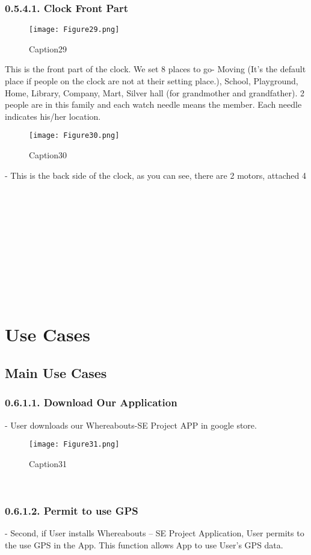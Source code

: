 \documentclass[10pt,a4paper,twocolumn]{report}
\begin{document}
		\subsubsection{0.5.4.1. Clock Front Part}
		\begin{figure}[h]
				\texttt{[image: Figure29.png]}
				\caption{Caption29}
				\label{fig29}
		\end{figure}
		This is the front part of the clock. We set 8 places to go-
Moving (It’s the default place if people on the clock are not at
their setting place.), School, Playground, Home, Library,
Company, Mart, Silver hall (for grandmother and grandfather).
2 people are in this family and each watch needle means the
member. Each needle indicates his/her location.
		\begin{figure}[h]
				\texttt{[image: Figure30.png]}
				\caption{Caption30}
				\label{fig30}
		\end{figure}
		- This is the back side of the clock, as you can see, there are 2 motors, attached 4
		\\\\\\\\\\\\\\\\\\\\\
\section{Use Cases}		
	\subsection{Main Use Cases}
		\subsubsection{0.6.1.1. Download Our Application}
		- User downloads our Whereabouts-SE Project APP in google store. \\
			\begin{figure}[h]
				\texttt{[image: Figure31.png]}
				\caption{Caption31}
				\label{fig31}
			\end{figure}
		\\
		\subsubsection{0.6.1.2. Permit to use GPS}
		- Second, if User installs Whereabouts – SE Project Application, User permits to the use GPS in the App. This function allows App to use User’s GPS data.\\
\end{document}
